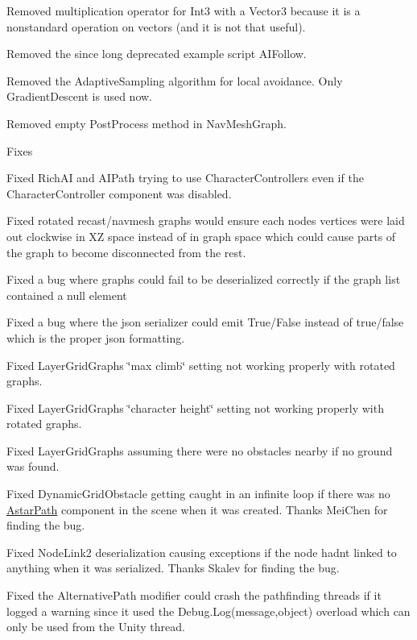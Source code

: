 \begin{DoxyItemize}
\begin{DoxyItemize}
\begin{DoxyItemize}
\item Removed multiplication operator for Int3 with a Vector3 because it is a nonstandard operation on vectors (and it is not that useful).
\item Removed the since long deprecated example script A\+I\+Follow.
\item Removed the Adaptive\+Sampling algorithm for local avoidance. Only Gradient\+Descent is used now.
\item Removed empty Post\+Process method in Nav\+Mesh\+Graph.
\end{DoxyItemize}
\item Fixes
\begin{DoxyItemize}
\item Fixed Rich\+AI and A\+I\+Path trying to use Character\+Controllers even if the Character\+Controller component was disabled.
\item Fixed rotated recast/navmesh graphs would ensure each node\textquotesingle{}s vertices were laid out clockwise in XZ space instead of in graph space which could cause parts of the graph to become disconnected from the rest.
\item Fixed a bug where graphs could fail to be deserialized correctly if the graph list contained a null element
\item Fixed a bug where the json serializer could emit True/\+False instead of true/false which is the proper json formatting.
\item Fixed Layer\+Grid\+Graphs\textquotesingle{} \char`\"{}max climb\char`\"{} setting not working properly with rotated graphs.
\item Fixed Layer\+Grid\+Graphs\textquotesingle{} \char`\"{}character height\char`\"{} setting not working properly with rotated graphs.
\item Fixed Layer\+Grid\+Graphs assuming there were no obstacles nearby if no ground was found.
\item Fixed Dynamic\+Grid\+Obstacle getting caught in an infinite loop if there was no \mbox{\hyperlink{class_astar_path}{Astar\+Path}} component in the scene when it was created. Thanks Mei\+Chen for finding the bug.
\item Fixed Node\+Link2 deserialization causing exceptions if the node hadn\textquotesingle{}t linked to anything when it was serialized. Thanks Skalev for finding the bug.
\item Fixed the Alternative\+Path modifier could crash the pathfinding threads if it logged a warning since it used the Debug.\+Log(message,object) overload which can only be used from the Unity thread.

\end{DoxyItemize}
\end{DoxyItemize}
\end{DoxyItemize}
